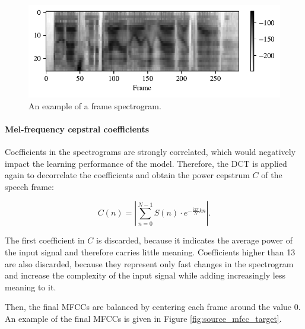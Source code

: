 			\begin{figure}[ht]
				\centering
			    \includegraphics[width=\linewidth]{gfx/spectrogram}
			    \caption{An example of a frame spectrogram.}
			    \label{fig:spectrogram}
			\end{figure}

		\paragraph{Mel-frequency cepstral coefficients}

			Coefficients in the spectrograms are strongly correlated, which would negatively impact the learning performance of the model.
			Therefore, the DCT is applied again to decorrelate the coefficients and obtain the power cepstrum $C$ of the speech frame:

			\begin{equation}
				C(n) = \left|\sum_{n=0}^{N-1}S(n)\cdot e^{-\frac{i2\pi}{N}kn}\right|.
			\end{equation}

			The first coefficient in $C$ is discarded, because it indicates the average power of the input signal and therefore carries little meaning.
			Coefficients higher than 13 are also discarded, because they represent only fast changes in the spectrogram and increase the complexity of the input signal while adding increasingly less meaning to it.

			Then, the final MFCCs are balanced by centering each frame around the value 0.
			An example of the final MFCCs is given in Figure \ref{fig:source_mfcc_target}.

